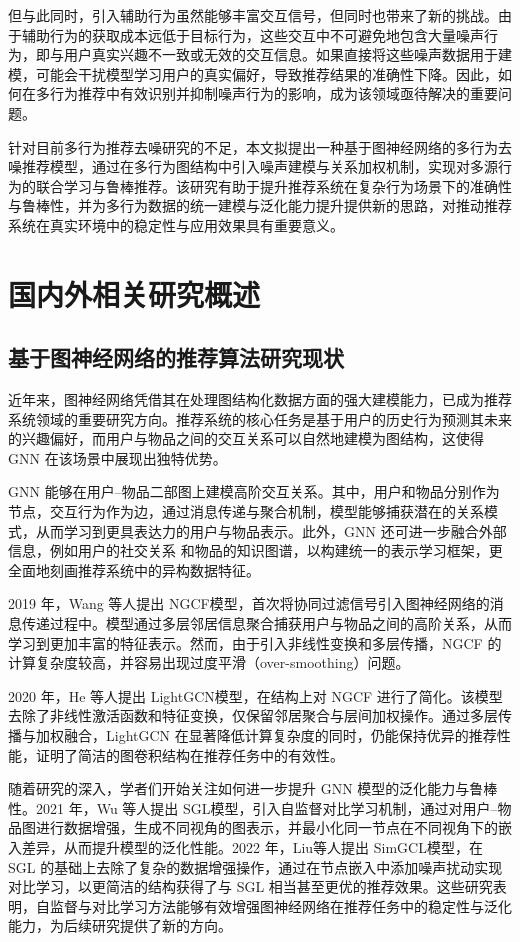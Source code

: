 但与此同时，引入辅助行为虽然能够丰富交互信号，但同时也带来了新的挑战。由于辅助行为的获取成本远低于目标行为，这些交互中不可避免地包含大量噪声行为，即与用户真实兴趣不一致或无效的交互信息。如果直接将这些噪声数据用于建模，可能会干扰模型学习用户的真实偏好，导致推荐结果的准确性下降。因此，如何在多行为推荐中有效识别并抑制噪声行为的影响，成为该领域亟待解决的重要问题。

针对目前多行为推荐去噪研究的不足，本文拟提出一种基于图神经网络的多行为去噪推荐模型，通过在多行为图结构中引入噪声建模与关系加权机制，实现对多源行为的联合学习与鲁棒推荐。该研究有助于提升推荐系统在复杂行为场景下的准确性与鲁棒性，并为多行为数据的统一建模与泛化能力提升提供新的思路，对推动推荐系统在真实环境中的稳定性与应用效果具有重要意义。

\section{国内外相关研究概述}


\subsection{基于图神经网络的推荐算法研究现状}
近年来，图神经网络凭借其在处理图结构化数据方面的强大建模能力，已成为推荐系统领域的重要研究方向。推荐系统的核心任务是基于用户的历史行为预测其未来的兴趣偏好，而用户与物品之间的交互关系可以自然地建模为图结构，这使得 GNN 在该场景中展现出独特优势。

GNN 能够在用户–物品二部图上建模高阶交互关系\cite{ying2018Pinsage}。其中，用户和物品分别作为节点，交互行为作为边，通过消息传递与聚合机制，模型能够捕获潜在的关系模式，从而学习到更具表达力的用户与物品表示。此外，GNN 还可进一步融合外部信息，例如用户的社交关系\cite{wu2019Social} 和物品的知识图谱\cite{wang2019Knowlegde-Graph}，以构建统一的表示学习框架，更全面地刻画推荐系统中的异构数据特征。

2019 年，Wang 等人提出 NGCF模型\cite{wang2019NGCF}，首次将协同过滤信号引入图神经网络的消息传递过程中。模型通过多层邻居信息聚合捕获用户与物品之间的高阶关系，从而学习到更加丰富的特征表示。然而，由于引入非线性变换和多层传播，NGCF 的计算复杂度较高，并容易出现过度平滑（over-smoothing）问题。

2020 年，He 等人提出 LightGCN模型\cite{he2020lightgcn}，在结构上对 NGCF 进行了简化。该模型去除了非线性激活函数和特征变换，仅保留邻居聚合与层间加权操作。通过多层传播与加权融合，LightGCN 在显著降低计算复杂度的同时，仍能保持优异的推荐性能，证明了简洁的图卷积结构在推荐任务中的有效性。

随着研究的深入，学者们开始关注如何进一步提升 GNN 模型的泛化能力与鲁棒性。2021 年，Wu 等人提出 SGL模型\cite{wu2021SGL}，引入自监督对比学习机制，通过对用户–物品图进行数据增强，生成不同视角的图表示，并最小化同一节点在不同视角下的嵌入差异，从而提升模型的泛化性能。2022 年，Liu等人提出 SimGCL模型\cite{liu2024simgcl}，在 SGL 的基础上去除了复杂的数据增强操作，通过在节点嵌入中添加噪声扰动实现对比学习，以更简洁的结构获得了与 SGL 相当甚至更优的推荐效果。这些研究表明，自监督与对比学习方法能够有效增强图神经网络在推荐任务中的稳定性与泛化能力，为后续研究提供了新的方向。

